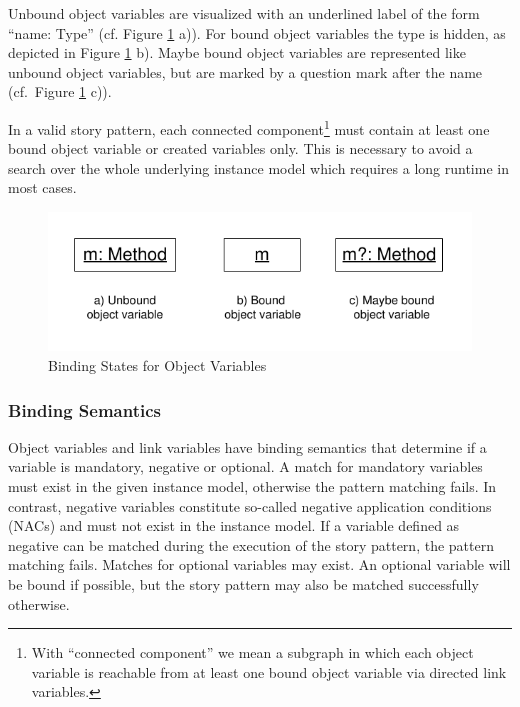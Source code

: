 Unbound object variables are visualized with an underlined label of the form
``name: Type'' (cf. Figure \ref{fig:bindingStatesOverview} a)).
For bound object variables the type is hidden, as depicted
in Figure \ref{fig:bindingStatesOverview} b).
Maybe bound object variables are represented like unbound object variables, but
are marked by a question mark after the name (cf.\ Figure
\ref{fig:bindingStatesOverview} c)).

In a valid story pattern, each connected component\footnote{With
``connected component'' we mean a subgraph in which each object variable is
reachable from at least one bound object variable via directed link variables.}
must contain at least one bound object variable or created variables only. This
is necessary to avoid a search over the whole underlying instance model which requires a long runtime in most cases.

\begin{figure}[htbp]
  \centering
  \includegraphics[scale=1.2]{figures/BindingStatesOverview}
  \caption{Binding States for Object Variables}
  \label{fig:bindingStatesOverview}
\end{figure}

\subsubsection{Binding Semantics}
\label{sec:StoryPatterns:binding:semantics}
Object variables and link variables have binding semantics that
determine if a variable is mandatory, negative or optional.
A match for mandatory variables must exist in the given instance model, otherwise
the pattern matching fails. 
In contrast, negative variables constitute so-called negative application
conditions (NACs) and must not exist in the instance model. If a variable defined as
negative can be matched during the execution of the story pattern, the pattern matching
fails. Matches for optional variables may exist. An optional variable will be
bound if possible, but the story pattern may also be matched
successfully otherwise.

